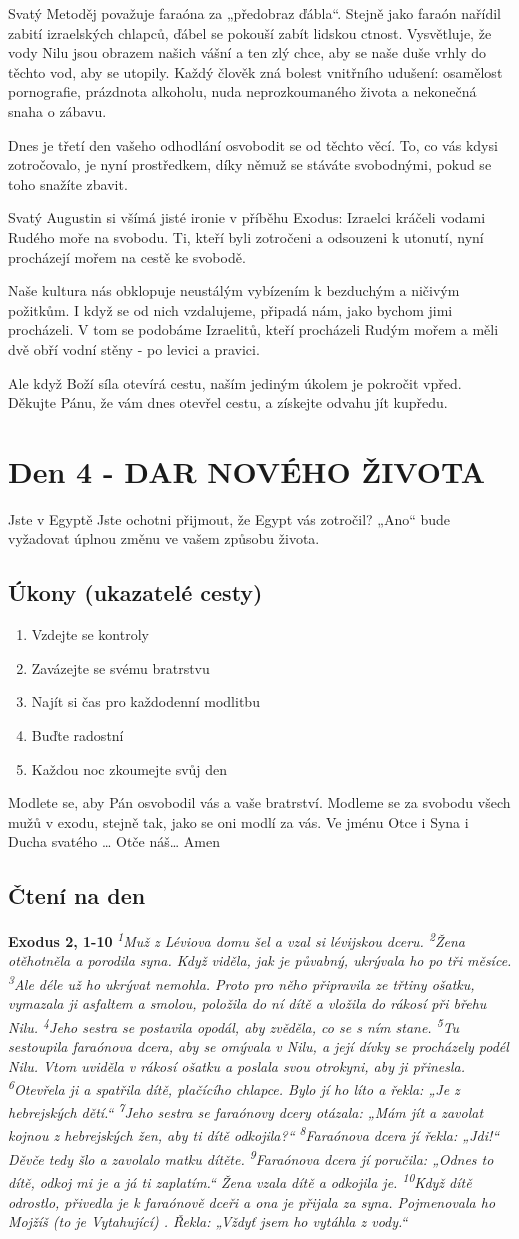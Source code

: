 \documentclass[11pt]{article}
\newcommand{\zacatekPrvniTyden}{
  Jste v Egyptě \newline
  Jste ochotni přijmout, že Egypt vás zotročil? „Ano“ bude vyžadovat úplnou změnu ve vašem způsobu života.

\subsection*{Úkony (ukazatelé cesty)}
\begin{enumerate}
  \item Vzdejte se kontroly
  \item Zavázejte se svému bratrstvu
  \item Najít si čas pro každodenní modlitbu
  \item Buďte radostní
  \item Každou noc zkoumejte svůj den
\end{enumerate}
Modlete se, aby Pán osvobodil vás a vaše bratrství. \newline
Modleme se za svobodu všech mužů v exodu, stejně tak, jako se oni modlí za vás.\newline
Ve jménu Otce i Syna i Ducha svatého …  Otče náš… Amen
}
\begin{document}
Svatý Metoděj považuje faraóna za „předobraz ďábla“. Stejně jako faraón nařídil zabití izraelských chlapců, ďábel se pokouší zabít lidskou ctnost. Vysvětluje, že vody Nilu jsou obrazem našich vášní a ten zlý chce, aby se naše duše vrhly do těchto vod, aby se utopily. Každý člověk zná bolest vnitřního udušení: osamělost pornografie, prázdnota alkoholu, nuda neprozkoumaného života a nekonečná snaha o zábavu.

Dnes je třetí den vašeho odhodlání osvobodit se od těchto věcí. To, co vás kdysi zotročovalo, je nyní prostředkem, díky němuž se stáváte svobodnými, pokud se toho snažíte zbavit.

Svatý Augustin si všímá jisté ironie v příběhu Exodus: Izraelci kráčeli vodami Rudého moře na svobodu. Ti, kteří byli zotročeni a odsouzeni k utonutí, nyní procházejí mořem na cestě ke svobodě.

Naše kultura nás obklopuje neustálým vybízením k bezduchým a ničivým požitkům. I když se od nich vzdalujeme, připadá nám, jako bychom jimi procházeli. V tom se podobáme Izraelitů, kteří procházeli Rudým mořem a měli dvě obří vodní stěny - po levici a pravici.

Ale když Boží síla otevírá cestu, naším jediným úkolem je pokročit vpřed.
Děkujte Pánu, že vám dnes otevřel cestu, a získejte odvahu jít kupředu.


\newpage
\section{Den 4 - DAR NOVÉHO ŽIVOTA}
\zacatekPrvniTyden
\subsection*{Čtení na den}
\textbf{Exodus 2, 1-10}
\newline
\textit{
\textsuperscript{1}Muž z Léviova domu šel a vzal si lévijskou dceru.
\textsuperscript{2}Žena otěhotněla a porodila syna. Když viděla, jak je půvabný, ukrývala ho po tři měsíce.
\textsuperscript{3}Ale déle už ho ukrývat nemohla. Proto pro něho připravila ze třtiny ošatku, vymazala ji asfaltem a smolou, položila do ní dítě a vložila do rákosí při břehu Nilu.
\textsuperscript{4}Jeho sestra se postavila opodál, aby zvěděla, co se s ním stane.
\textsuperscript{5}Tu sestoupila faraónova dcera, aby se omývala v Nilu, a její dívky se procházely podél Nilu. Vtom uviděla v rákosí ošatku a poslala svou otrokyni, aby ji přinesla.
\textsuperscript{6}Otevřela ji a spatřila dítě, plačícího chlapce. Bylo jí ho líto a řekla: „Je z hebrejských dětí.“
\textsuperscript{7}Jeho sestra se faraónovy dcery otázala: „Mám jít a zavolat kojnou z hebrejských žen, aby ti dítě odkojila?“
\textsuperscript{8}Faraónova dcera jí řekla: „Jdi!“ Děvče tedy šlo a zavolalo matku dítěte.
\textsuperscript{9}Faraónova dcera jí poručila: „Odnes to dítě, odkoj mi je a já ti zaplatím.“ Žena vzala dítě a odkojila je.
\textsuperscript{10}Když dítě odrostlo, přivedla je k faraónově dceři a ona je přijala za syna. Pojmenovala ho Mojžíš (to je Vytahující) . Řekla: „Vždyť jsem ho vytáhla z vody.“}
\end{document}
